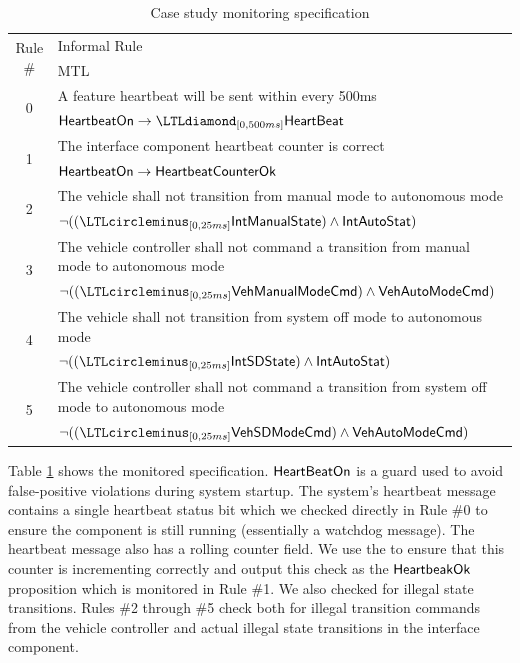 \begin{table}[t]
\centering
\footnotesize
\begin{tabular}{|c|p{4.3in}|}
\hline \multirow{2}{*}{Rule \#} & Informal Rule \\ & MTL \\
\hline \multirow{2}{*}{0} & A feature heartbeat will be sent within every 500ms \\
& $\pred{HeartbeatOn} \rightarrow \LTLdiamond_{[0,500ms]} \pred{HeartBeat}$ \\
\hline \multirow{2}{*}{1} & The interface component heartbeat counter is correct \\
& $\mathsf{HeartbeatOn} \rightarrow \mathsf{HeartbeatCounterOk}$ \\
\hline \multirow{2}{*}{2} & The vehicle shall not transition from manual mode to autonomous mode \\
&  $\neg ((\LTLcircleminus_{[0,25ms]} \pred{IntManualState}) \wedge \pred{IntAutoStat})$\\
\hline \multirow{2}{*}{3} & The vehicle controller shall not command a transition from manual mode to autonomous mode \\
& $\neg ((\LTLcircleminus_{[0,25ms]} \pred{VehManualModeCmd}) \wedge \pred{VehAutoModeCmd})$\\
\hline \multirow{2}{*}{4} & The vehicle shall not transition from system off mode to autonomous mode \\
&  $\neg ((\LTLcircleminus_{[0,25ms]} \pred{IntSDState}) \wedge \pred{IntAutoStat})$\\
\hline \multirow{2}{*}{5} & The vehicle controller shall not command a transition from system off mode to autonomous mode \\
& $\neg ((\LTLcircleminus_{[0,25ms]} \pred{VehSDModeCmd}) \wedge \pred{VehAutoModeCmd})$\\
\hline
\end{tabular}
\caption{Case study monitoring specification \label{tab:monspec}}
\end{table}

Table \ref{tab:monspec} shows the monitored specification.
$\mathsf{HeartBeatOn}$ is a guard used to avoid false-positive violations during system startup.
The system's heartbeat message contains a single heartbeat status bit which we checked directly in Rule \#0 to ensure the component is still running (essentially a watchdog message).
The heartbeat message also has a rolling counter field.
We use the \sfmap to ensure that this counter is incrementing correctly and output this check as the $\mathsf{HeartbeakOk}$ proposition which is monitored in Rule \#1.
We also checked for illegal state transitions. Rules \#2 through \#5 check both for illegal transition commands from the vehicle controller and actual illegal state transitions in the interface component.


